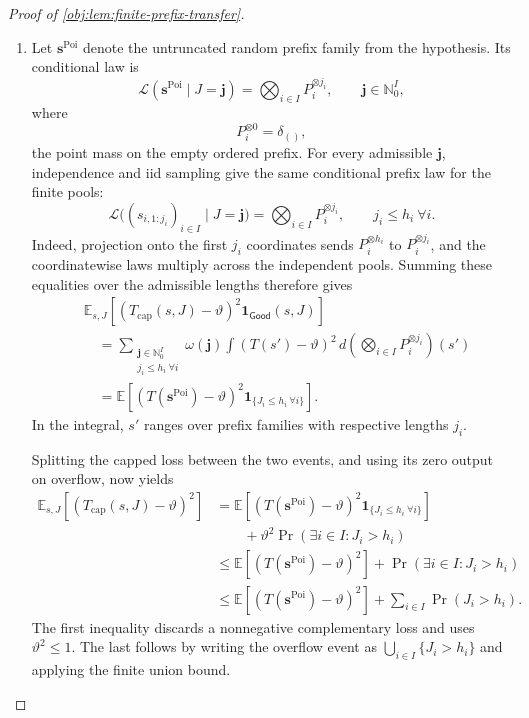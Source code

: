 \begin{proof}[Proof of \cref{obj:lem:finite-prefix-transfer}]
\begin{enumerate}
\item Let \(\boldsymbol s^{\mathrm{Poi}}\) denote the untruncated random prefix family from the hypothesis. Its conditional law is
\[
\mathcal L(\boldsymbol s^{\mathrm{Poi}}\mid J=\mathbf j)
=
\bigotimes_{i\in I}P_i^{\otimes j_i},
\qquad
\mathbf j\in\mathbb N_0^I,
\]
where
\[
P_i^{\otimes0}=\delta_{()},
\]
the point mass on the empty ordered prefix. For every admissible \(\mathbf j\), independence and iid sampling give the same conditional prefix law for the finite pools:
\[
\mathcal L\bigl((s_{i,1:j_i})_{i\in I}\mid J=\mathbf j\bigr)
=
\bigotimes_{i\in I}P_i^{\otimes j_i},
\qquad j_i\le h_i\ \forall i.
\]
Indeed, projection onto the first \(j_i\) coordinates sends
\(P_i^{\otimes h_i}\) to \(P_i^{\otimes j_i}\), and the coordinatewise laws multiply across the independent pools. Summing these equalities over the admissible lengths therefore gives
\[
\begin{aligned}
&\mathbb E_{s,J}\!\left[
(T_{\mathrm{cap}}(s,J)-\vartheta)^2
\mathbf1_{\mathsf{Good}}(s,J)\right]\\
&\quad=
\sum_{\substack{\mathbf j\in\mathbb N_0^I\\j_i\le h_i\ \forall i}}
\omega(\mathbf j)
\int
(T(s')-\vartheta)^2\,
d\!\left(\bigotimes_{i\in I}P_i^{\otimes j_i}\right)(s')\\
&\quad=
\mathbb E\!\left[
(T(\boldsymbol s^{\mathrm{Poi}})-\vartheta)^2
\mathbf1_{\{J_i\le h_i\ \forall i\}}\right].
\end{aligned}
\]
In the integral, \(s'\) ranges over prefix families with respective lengths \(j_i\). %

Splitting the capped loss between the two events, and using its zero output on overflow, now yields
\[
\begin{aligned}
\mathbb E_{s,J}[(T_{\mathrm{cap}}(s,J)-\vartheta)^2]
&=
\mathbb E\!\left[
(T(\boldsymbol s^{\mathrm{Poi}})-\vartheta)^2
\mathbf1_{\{J_i\le h_i\ \forall i\}}\right]\\
&\qquad+
\vartheta^2\Pr(\exists i\in I:J_i>h_i)\\
&\le
\mathbb E[(T(\boldsymbol s^{\mathrm{Poi}})-\vartheta)^2]
+\Pr(\exists i\in I:J_i>h_i)\\
&\le
\mathbb E[(T(\boldsymbol s^{\mathrm{Poi}})-\vartheta)^2]
+\sum_{i\in I}\Pr(J_i>h_i).
\end{aligned}
\]
The first inequality discards a nonnegative complementary loss and uses
\(\vartheta^2\le1\). The last follows by writing the overflow event as
\(\bigcup_{i\in I}\{J_i>h_i\}\) and applying the finite union bound. %


\end{enumerate}
\end{proof}
